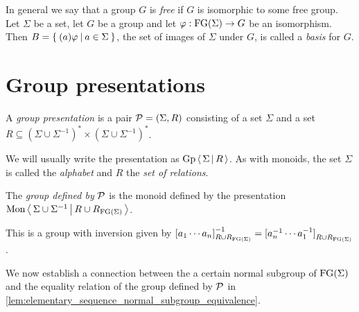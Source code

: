 In general we say that a group $G$ is \emph{free} if $G$ is isomorphic to some free group.
Let $\Sigma$ be a set, let $G$ be a group and let $\varphi: \textrm{FG}(\Sigma) \rightarrow G$ be an
isomorphism. Then $B = \left\{\: (a)\varphi \: \middle|\: a\in \Sigma \:\right\}$, the set of images of $\Sigma$ under $G$,
is called a \emph{basis} for $G$.

\section{Group presentations}


\begin{definition}%
  \label{def:group_presentation}
  \rocqok{}
A \emph{group presentation} is a pair $\mathcal{P} = (\Sigma, R)$ consisting of a set $\Sigma$ and a set
$R\subseteq {\left(\Sigma\cup \Sigma^{-1}\right)}^\ast \times {\left(\Sigma \cup \Sigma^{-1}\right)}^\ast$.
\end{definition}
We will usually write the presentation as
$\textrm{Gp}\left\langle\, \Sigma \,\middle|\, R \,\right\rangle$. As with monoids, the set $\Sigma$ is called the \emph{alphabet} and $R$ the
\emph{set of relations}.
\begin{definition}
  \label{def:presented_group}
  \rocqok{}
The \emph{group defined by} $\mathcal{P}$ is the monoid defined by the presentation
$\textrm{Mon}\left\langle\, \Sigma \cup \Sigma^{-1} \,\middle|\, R\cup R_{\textrm{FG}(\Sigma)} \,\right\rangle$.
\end{definition}
This is a group with inversion given by
${[a_1\cdots a_n]}_{R\cup R_{\textrm{FG}(\Sigma)}}^{-1} = {[a_n^{-1}\cdots a_1^{-1}]}_{R\cup R_{\textrm{FG}(\Sigma)}}$.


We now establish a connection between the a certain normal subgroup of $\textrm{FG}(\Sigma)$ and the equality relation of the
group defined by $\mathcal{P}$
in \cref{lem:elementary_sequence_normal_subgroup_equivalence}.


